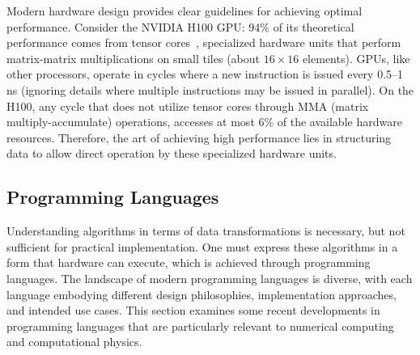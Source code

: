 \normalcaptionwidth
\captionwidth{\linewidth}
\begin{figure}[h]
    \centering
    \begin{minipage}[t]{0.4\textwidth}%
      \vspace{-\fboxsep}%
      
    \end{minipage}%
    \hspace{0.05\textwidth}%
    \begin{minipage}[t]{0.47\textwidth}%
      \vspace{5pt}%
      \centering%
      \label{fig:in:gemm-flops}
    \end{minipage}%
\end{figure}
\changecaptionwidth
{}

Modern hardware design provides clear guidelines for achieving optimal performance. Consider the NVIDIA H100 GPU: 94\% of its theoretical performance comes from tensor cores~, specialized hardware units that perform matrix-matrix multiplications on small tiles (about $16\times 16$ elements). GPUs, like other processors, operate in cycles where a new instruction is issued every 0.5--1 ns (ignoring details where multiple instructions may be issued in parallel). On the H100, any cycle that does not utilize tensor cores through MMA (matrix multiply-accumulate) operations, accesses at most 6\% of the available hardware resources. Therefore, the art of achieving high performance lies in structuring data to allow direct operation by these specialized hardware units.

\subsection{Programming Languages}

Understanding algorithms in terms of data transformations is necessary, but not sufficient for practical implementation. One must express these algorithms in a form that hardware can execute, which is achieved through programming languages. The landscape of modern programming languages is diverse, with each language embodying different design philosophies, implementation approaches, and intended use cases. This section examines some recent developments in programming languages that are particularly relevant to numerical computing and computational physics.

